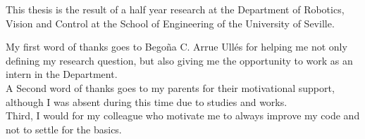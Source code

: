 
This thesis is the result of a half year research at the Department of Robotics, Vision and Control at the School of Engineering of the University of Seville.


My first word of thanks goes to Bego\~na C. Arrue Ull\'es for helping me not only defining my research question, but also giving me the opportunity to work as an intern in the Department. \\

A Second word of thanks goes to my parents for their motivational support, although I was absent during this time due to studies and works.  \\

Third, I would for my colleague who motivate me to always improve my code and not to settle for the basics.  \\


